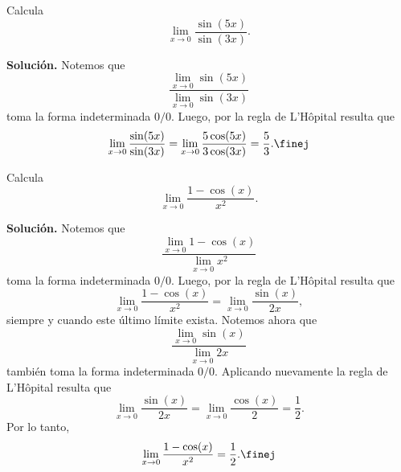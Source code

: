 \documentclass[12pt,a4paper]{book}
\begin{document}
    \begin{ejemplo}\label{ejm:101}
        Calcula
        \begin{equation*}
            \lim_{x\to 0}\frac{\sin(5x)}{\sin(3x)}.
        \end{equation*}

        \textbf{Solución.} Notemos que
        \begin{equation*}
            \frac{\lim_{x\to 0}\sin(5x)}{\lim_{x\to 0}\sin(3x)}
        \end{equation*}
        toma la forma indeterminada $0/0$. Luego, por la regla de L'Hôpital resulta
        que
        \begin{equation*}
            \lim_{x\to 0}\frac{\sin(5x)}{\sin(3x)}=\lim_{x\to 0}\frac{5\cos(5x)}{3\cos(3x)}=\frac{5}{3}.\finej
        \end{equation*}
    \end{ejemplo}

    \begin{ejemplo}\label{ejm:102}
        Calcula
        \begin{equation*}
            \lim_{x\to 0}\frac{1-\cos(x)}{x^{2}}.
        \end{equation*}

        \textbf{Solución.} Notemos que
        \begin{equation*}
            \frac{\lim_{x\to 0}1-\cos(x)}{\lim_{x\to 0}x^{2}}
        \end{equation*}
        toma la forma indeterminada $0/0$. Luego, por la regla de L'Hôpital resulta
        que
        \begin{equation*}
            \lim_{x\to 0}\frac{1-\cos(x)}{x^{2}}=\lim_{x\to 0}\frac{\sin(x)}{2x},
        \end{equation*}
        siempre y cuando este último límite exista. Notemos ahora que
        \begin{equation*}
            \frac{\lim_{x\to 0}\sin(x)}{\lim_{x\to 0}2x}
        \end{equation*}
        también toma la forma indeterminada $0/0$. Aplicando nuevamente la regla
        de L'Hôpital resulta que
        \begin{equation*}
            \lim_{x\to 0}\frac{\sin(x)}{2x}=\lim_{x\to 0}\frac{\cos(x)}{2}=\frac{1}{2}.
        \end{equation*}
        Por lo tanto,
        \begin{equation*}
            \lim_{x\to 0}\frac{1-\cos(x)}{x^{2}}=\frac{1}{2}.\finej
        \end{equation*}
    \end{ejemplo}
\end{document}
